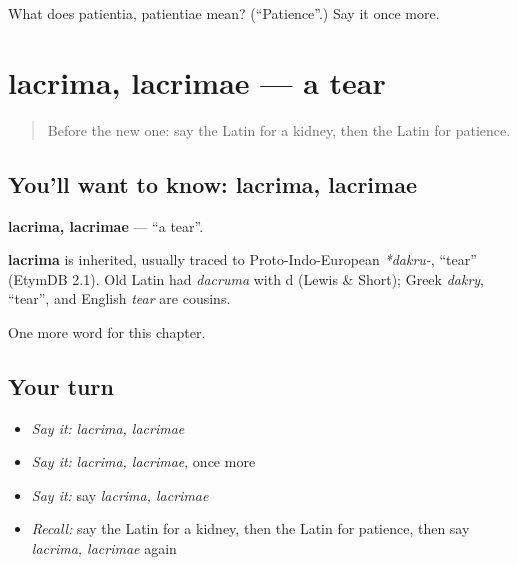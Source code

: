 \begin{tcolorbox}[breakable,colback=teal!4,colframe=teal!35!black,title={Before you move on}]
What does patientia, patientiae mean? (\textquotedblleft{}Patience\textquotedblright{}.) Say it once more.
\end{tcolorbox}
\section[lacrima, lacrimae]{lacrima, lacrimae — a tear}

\label{lesson:LA-C174-lacrima}



\begin{quote}
Before the new one: say the Latin for a kidney, then the Latin for patience.
\end{quote}

\subsection*{You'll want to know: lacrima, lacrimae}
\textbf{lacrima, lacrimae} — \textquotedblleft{}a tear\textquotedblright{}.

\begin{cousinweb}
\textbf{lacrima} is inherited, usually traced to Proto-Indo-European \emph{*dakru-}, \textquotedblleft{}tear\textquotedblright{} (EtymDB 2.1). Old Latin had \emph{dacruma} with d (Lewis \& Short); Greek \emph{dakry}, \textquotedblleft{}tear\textquotedblright{}, and English \emph{tear} are cousins.
\end{cousinweb}

\begin{grammarlens}[title={What you've built}]
One more word for this chapter.
\end{grammarlens}

\subsection*{Your turn}
\begin{itemize}
\raggedright
  \item \emph{Say it:} \emph{lacrima, lacrimae}
  \item \emph{Say it:} \emph{lacrima, lacrimae}, once more
  \item \emph{Say it:} say \emph{lacrima, lacrimae}
  \item \emph{Recall:} say the Latin for a kidney, then the Latin for patience, then say \emph{lacrima, lacrimae} again
\end{itemize}


